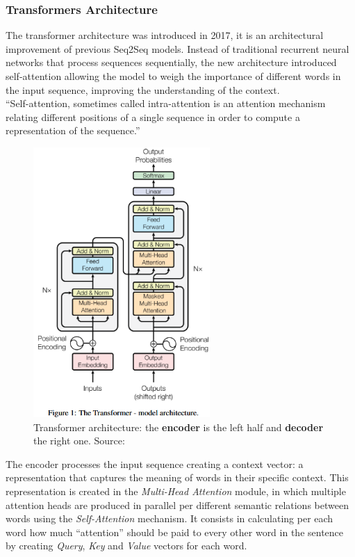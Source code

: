 \documentclass[12pt]{article}
\begin{document}
        \subsubsection{Transformers Architecture}
The transformer architecture was introduced in 2017, it is an architectural improvement of previous Seq2Seq models. Instead of traditional recurrent neural networks that process sequences sequentially, the new architecture introduced self-attention %
allowing the model to weigh the importance of different words in the input sequence, improving the understanding of the context.\\
``Self-attention, sometimes called intra-attention is an attention mechanism relating different positions of a single sequence in order to compute a representation of the sequence.''\cite{vaswani2023attentionneed}\\
	\begin{figure}[H]
    \centering
            \includegraphics[width=0.6\textwidth]{transformer.png}
    \caption[Transformer architecture]{Transformer architecture: the \textbf{encoder} is the left half and \textbf{decoder} the right one. Source: \cite{vaswani2023attentionneed}}
    \end{figure}
The encoder processes the input sequence creating a context vector: a representation that captures the meaning of words in their specific context. This representation is created in the \textit{Multi-Head Attention} module, in which multiple attention heads are produced in parallel per different semantic relations between words using the \textit{Self-Attention} mechanism. It consists in calculating per each word how much ``attention'' should be paid to every other word in the sentence by creating \textit{Query}, \textit{Key} and \textit{Value} vectors for each word.
\end{document}
